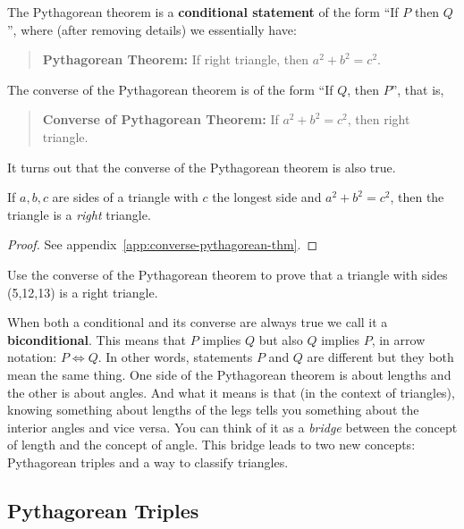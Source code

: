The Pythagorean theorem is a \textbf{conditional statement} of the
form ``If \(P\) then \(Q\)'', where (after removing details) we
essentially have:
\begin{quotation}
  \textbf{Pythagorean Theorem:} If right triangle, then
  \(a^{2}+b^{2} = c^{2}\).
\end{quotation}
The converse of the Pythagorean theorem is of the form ``If \(Q\),
then \(P\)'', that is,
\begin{quotation}
  \textbf{Converse of Pythagorean Theorem:} If \(a^{2}+b^{2} = c^{2}\),
  then right triangle.
\end{quotation}
It turns out that the converse of the Pythagorean theorem is also
true.

\begin{theorem}
  If \(a,b,c\) are sides of a triangle with \(c\) the longest side and
  \(a^{2} + b^{2} = c^{2}\), then the triangle is a \emph{right}
  triangle.
\end{theorem}
\begin{proof}
See appendix~\ref{app:converse-pythagorean-thm}.
\end{proof}

\begin{exercise}
  Use the converse of the Pythagorean theorem to prove that a
  triangle with sides (5,12,13) is a right triangle.

\end{exercise}

When both a conditional and its converse are always true we call it a
\textbf{biconditional}. This means that \(P\) implies \(Q\) but also
\(Q\) implies \(P\), in arrow notation: \(P \Leftrightarrow Q\). In
other words, statements \(P\) and \(Q\) are different but they both
mean the same thing. One side of the Pythagorean theorem is about
lengths and the other is about angles. And what it means is that (in
the context of triangles), knowing something about lengths of the legs
tells you something about the interior angles and vice versa. You can
think of it as a \emph{bridge} between the concept of length and the
concept of angle. This bridge leads to two new concepts: Pythagorean
triples and a way to classify triangles.

\newpage

\subsection{Pythagorean Triples}%
\label{sub:pythagorean-triples}

